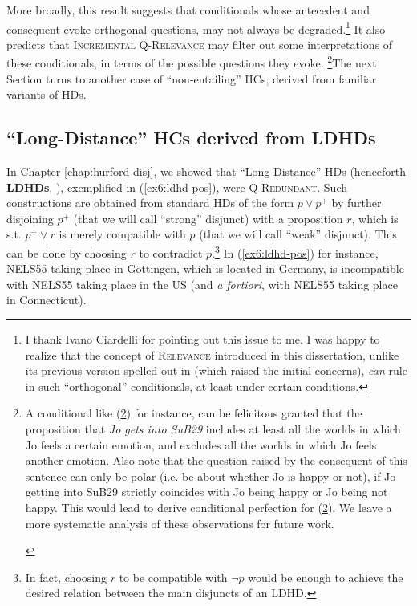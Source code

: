 More broadly, this result suggests that conditionals whose antecedent and consequent evoke orthogonal questions, may not always be degraded.\footnote{I thank Ivano Ciardelli for pointing out this issue to me. I was happy to realize that the concept of \textsc{Relevance} introduced in this dissertation, unlike its previous version spelled out in \citet{HenotMortier2024a} (which raised the initial concerns), \textit{can} rule in such ``orthogonal'' conditionals, at least under certain conditions.} It also predicts that \textsc{Incremental Q-Relevance} may filter out some interpretations of these conditionals, in terms of the possible questions they evoke. \footnote{A conditional like (\ref{ex6:orthogonal-conditional}) for instance, can be felicitous granted that the proposition that \textit{Jo gets into SuB29} includes at least all the worlds in which Jo feels a certain emotion, and excludes all the worlds in which Jo feels another emotion. Also note that the question raised by the consequent of this sentence can only be polar (i.e. be about whether Jo is happy or not), if Jo getting into SuB29 strictly coincides with Jo being happy or Jo being not happy. This would lead to derive conditional perfection for (\ref{ex6:orthogonal-conditional}). We leave a more systematic analysis of these observations for future work.

\begin{exe}
	\label{ex6:orthogonal-conditional}
\end{exe}}The next Section turns to another case of ``non-entailing'' HCs, derived from familiar variants of HDs.


\subsection{``Long-Distance'' HCs derived from LDHDs}\label{sec:(ldh)c}

In Chapter \ref{chap:hurford-disj}, we showed that ``Long Distance'' HDs (henceforth \textbf{LDHDs}, ), exemplified in (\ref{ex6:ldhd-pos}), were \textsc{Q-Redundant}. Such constructions are obtained from standard HDs of the form $p \vee p^+$ by further disjoining $p^+$ (that we will call ``strong'' disjunct) with a proposition $r$, which is s.t. $p^+ \vee r$ is merely compatible with $p$ (that we will call ``weak'' disjunct). This can be done by choosing $r$ to contradict $p$.\footnote{In fact, choosing $r$ to be compatible with $\neg p$ would be enough to achieve the desired relation between the main disjuncts of an LDHD.} In (\ref{ex6:ldhd-pos}) for instance, NELS55 taking place in Göttingen, which is located in Germany, is incompatible with NELS55 taking place in the US (and \textit{a fortiori}, with NELS55 taking place in Connecticut).

